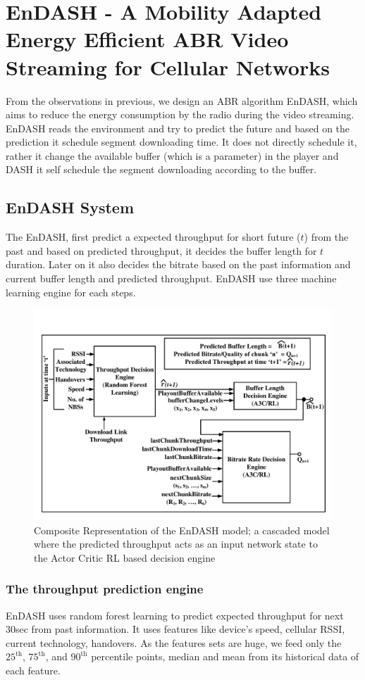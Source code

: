 \section{EnDASH - A Mobility Adapted Energy Efficient ABR Video Streaming for Cellular Networks}
From the observations in previous, we design an ABR algorithm EnDASH, which aims to reduce the energy consumption by the radio during the video streaming. EnDASH reads the environment and try to predict the future and based on the prediction it schedule segment downloading time. It does not directly schedule it, rather it change the available buffer (which is a parameter) in the player and DASH it self schedule the segment downloading according to the buffer.
\subsection{EnDASH System}
The EnDASH, first predict a expected throughput for short future ($t$) from the past and based on predicted throughput, it decides the buffer length for $t$ duration. Later on it also decides the bitrate based on the past information and current buffer length and predicted throughput.  EnDASH use three machine learning engine for each steps.

\begin{figure}[!h]
	\centering
	\includegraphics[width=0.7\linewidth]{img/EnDASH/EnDASH_system}
	\caption{Composite Representation of the EnDASH model; a cascaded model where the predicted throughput acts as an input network state to the Actor Critic RL based decision
engine}
	\label{fig:endash:system}
\end{figure}

\subsubsection{The throughput prediction engine}
EnDASH uses random forest learning to predict expected throughput for next 30sec from past information. It uses features like device's speed, cellular RSSI, current technology, handovers. As the features sets are huge, we feed only the $\mathrm{25^{th}}$, $\mathrm{75^{th}}$, and $\mathrm{90^{th}}$ percentile points, median and mean from its historical data of each feature.
